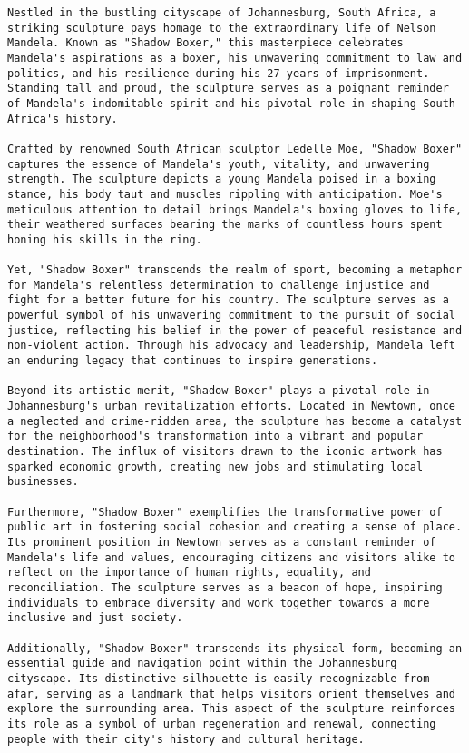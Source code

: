 \begin{lstlisting}
Nestled in the bustling cityscape of Johannesburg, South Africa, a striking sculpture pays homage to the extraordinary life of Nelson Mandela. Known as "Shadow Boxer," this masterpiece celebrates Mandela's aspirations as a boxer, his unwavering commitment to law and politics, and his resilience during his 27 years of imprisonment. Standing tall and proud, the sculpture serves as a poignant reminder of Mandela's indomitable spirit and his pivotal role in shaping South Africa's history.

Crafted by renowned South African sculptor Ledelle Moe, "Shadow Boxer" captures the essence of Mandela's youth, vitality, and unwavering strength. The sculpture depicts a young Mandela poised in a boxing stance, his body taut and muscles rippling with anticipation. Moe's meticulous attention to detail brings Mandela's boxing gloves to life, their weathered surfaces bearing the marks of countless hours spent honing his skills in the ring.

Yet, "Shadow Boxer" transcends the realm of sport, becoming a metaphor for Mandela's relentless determination to challenge injustice and fight for a better future for his country. The sculpture serves as a powerful symbol of his unwavering commitment to the pursuit of social justice, reflecting his belief in the power of peaceful resistance and non-violent action. Through his advocacy and leadership, Mandela left an enduring legacy that continues to inspire generations.

Beyond its artistic merit, "Shadow Boxer" plays a pivotal role in Johannesburg's urban revitalization efforts. Located in Newtown, once a neglected and crime-ridden area, the sculpture has become a catalyst for the neighborhood's transformation into a vibrant and popular destination. The influx of visitors drawn to the iconic artwork has sparked economic growth, creating new jobs and stimulating local businesses.

Furthermore, "Shadow Boxer" exemplifies the transformative power of public art in fostering social cohesion and creating a sense of place. Its prominent position in Newtown serves as a constant reminder of Mandela's life and values, encouraging citizens and visitors alike to reflect on the importance of human rights, equality, and reconciliation. The sculpture serves as a beacon of hope, inspiring individuals to embrace diversity and work together towards a more inclusive and just society.

Additionally, "Shadow Boxer" transcends its physical form, becoming an essential guide and navigation point within the Johannesburg cityscape. Its distinctive silhouette is easily recognizable from afar, serving as a landmark that helps visitors orient themselves and explore the surrounding area. This aspect of the sculpture reinforces its role as a symbol of urban regeneration and renewal, connecting people with their city's history and cultural heritage.


\end{lstlisting}
